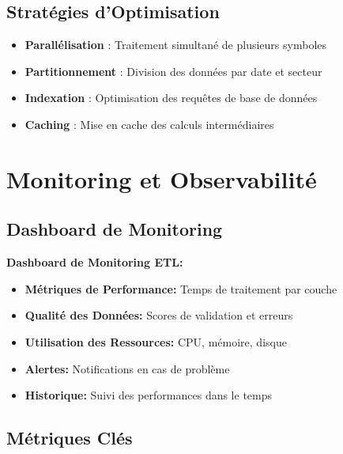 \subsection{Stratégies d'Optimisation}

\begin{itemize}
    \item \textbf{Parallélisation} : Traitement simultané de plusieurs symboles
    \item \textbf{Partitionnement} : Division des données par date et secteur
    \item \textbf{Indexation} : Optimisation des requêtes de base de données
    \item \textbf{Caching} : Mise en cache des calculs intermédiaires
\end{itemize}

\section{Monitoring et Observabilité}

\subsection{Dashboard de Monitoring}


\textbf{Dashboard de Monitoring ETL:}
\begin{itemize}
    \item \textbf{Métriques de Performance:} Temps de traitement par couche
    \item \textbf{Qualité des Données:} Scores de validation et erreurs
    \item \textbf{Utilisation des Ressources:} CPU, mémoire, disque
    \item \textbf{Alertes:} Notifications en cas de problème
    \item \textbf{Historique:} Suivi des performances dans le temps
\end{itemize}

\subsection{Métriques Clés}

